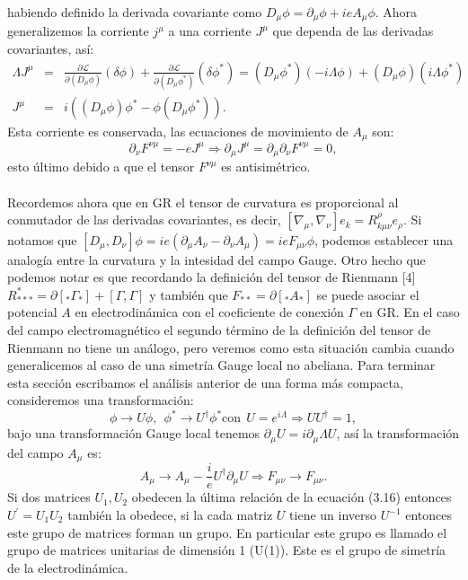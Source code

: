 habiendo definido la derivada covariante como $D_{\mu}\phi=\partial_{\mu}\phi+ieA_{\mu}\phi$. Ahora generalizemos la corriente $j^\mu$ a una corriente $J^\mu$ que dependa de las derivadas covariantes, así:\begin{eqnarray}
\nonumber \Lambda J^{\mu}&=&\frac{\partial\mathcal{L}}{\partial(D_{\mu}\phi)}(\delta\phi)+\frac{\partial\mathcal{L}}{\partial(D_{\mu}\phi^{*})}(\delta\phi^{*})=(D_{\mu}\phi^{*})(-i\Lambda\phi)+(D_{\mu}\phi)(i\Lambda\phi^{*})\\
J^\mu &=& i((D_{\mu}\phi)\phi^{*}-\phi(D_{\mu}\phi^{*})).
\end{eqnarray}
Esta corriente es conservada, las ecuaciones de movimiento de $A_\mu$ son:
\begin{equation}
\partial_{\nu}F^{\nu\mu}=-eJ^{\mu}\Rightarrow\partial_{\mu}J^{\mu}=\partial_{\mu}\partial_{\nu}F^{\nu\mu}=0,
\end{equation} 
esto último debido a que el tensor $F^{\nu\mu}$ es antisimétrico.
\\
\\
Recordemos ahora que en GR el tensor de curvatura es proporcional al conmutador de las derivadas covariantes, es decir, $[\nabla_{\mu},\nabla_{\nu}]e_{k}=R_{k\mu\nu}^{\rho}e_{\rho}$. Si notamos que $[D_{\mu},D_{\nu}]\phi=ie(\partial_{\mu}A_{\nu}-\partial_{\nu}A_{\mu})=ieF_{\mu\nu}\phi$, podemos establecer una analogía entre la curvatura y la intesidad del campo Gauge. Otro hecho que podemos notar es que recordando la definición del tensor de Rienmann [4] $R_{***}^{*}=\partial[_{*}\Gamma_{*}]+[\Gamma,\Gamma] $ y también que $F_{**}=\partial[_{*}A_{*}]$ se puede asociar el potencial $A$ en electrodinámica con el coeficiente de conexión $\Gamma$ en GR. En el caso  del campo electromagnético el segundo término de la definición del tensor de Rienmann no tiene un análogo, pero veremos como esta situación cambia cuando generalicemos al caso de una simetría Gauge local no abeliana. Para terminar esta sección escribamos el análisis anterior de una forma más compacta, consideremos una transformación:
\begin{equation}
\phi\to U\phi,\ \ \phi^{*}\to U^{\dagger}\phi^{*}\text{con}\ \ U=e^{i\Lambda}\Rightarrow UU^{\dagger}=1,
\end{equation}
bajo una transformación Gauge local tenemos $\partial_\mu U=i\partial_\mu\Lambda U$, así la transformación del campo $A_\mu$ es:
\begin{equation}
A_{\mu}\to A_{\mu}-\frac{i}{e}U^{\dagger}\partial_{\mu}U\Rightarrow F_{\mu\nu}\to F_{\mu\nu}.
\end{equation}
Si dos matrices $U_1,U_2$ obedecen la última relación de la ecuación (3.16) entonces $U^{\prime}=U_1U_2$ también la obedece, si la cada matriz $U$ tiene un inverso $U^{-1}$ entonces este grupo de matrices forman un grupo. En particular este grupo es llamado el grupo de matrices unitarias de dimensión 1 (U(1)). Este es el grupo de simetría de la electrodinámica.



